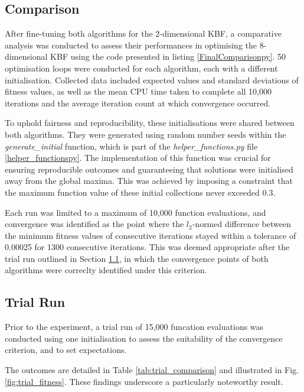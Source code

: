 \documentclass[10pt]{article}
\begin{document}
\begin{multicols}{2}
\section{Comparison}
\label{sec:CGA_QEG_comparison}

After fine-tuning both algorithms for the 2-dimensional KBF, a comparative analysis was conducted to assess their performances in optimising the 8-dimensional KBF using the code presented in listing \ref{FinalComparisonpy}. 50 optimisation loops were conducted for each algorithm, each with a different initialisation.  Collected data included expected values and standard deviations of fitness values, as well as the mean CPU time taken to complete all 10,000 iterations and the average iteration count at which convergence occurred.

To uphold fairness and reproducibility, these initialisations were shared between both algorithms. They were generated using random number seeds within the \textit{generate\_initial} function, which is part of the \textit{helper\_functions.py} file \ref{helper_functionspy}. The implementation of this function was crucial for ensuring reproducible outcomes and guaranteeing that solutions were initialised away from the global maxima. This was achieved by imposing a constraint that the maximum function value of these initial collections never exceeded 0.3.

Each run was limited to a maximum of 10,000 function evaluations, and convergence was identified as the point where the $l_2$-normed difference between the minimum fitness values of consecutive iterations stayed within a tolerance of 0.00025 for 1300 consecutive iterations. This was deemed appropriate after the trial run outlined in Section \ref{sec:trial}, in which the convergence points of both algorithms were correclty identified under this criterion.

\subsection{Trial Run}
\label{sec:trial}

Prior to the experiment, a trial run of 15,000 funcation evaluations was conducted using one initialisation to assess the suitability of the convergence criterion, and to set expectations.

The outcomes are detailed in Table \ref{tab:trial_comparison} and illustrated in Fig. \ref{fig:trial_fitness}. These findings underscore a particularly noteworthy result.


\end{multicols}
\end{document}
